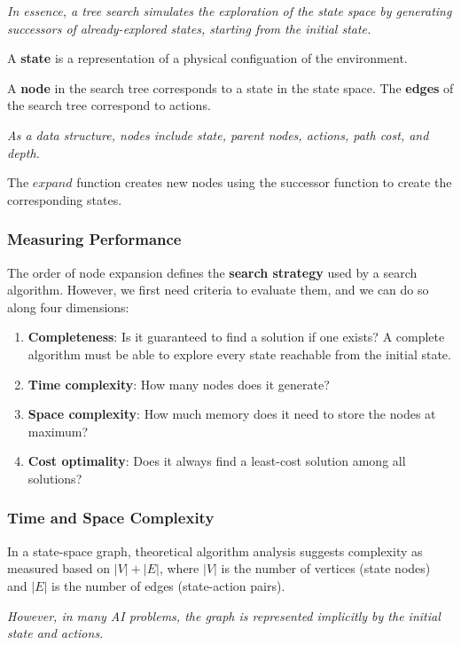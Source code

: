 \emph{In essence, a tree search simulates the exploration of the state space by generating successors of already-explored states, starting from the initial state.}

A \textbf{state} is a representation of a physical configuation of the environment.

A \textbf{node} in the search tree corresponds to a state in the state space. The \textbf{edges} of the search tree correspond to actions.

\emph{As a data structure, nodes include state, parent nodes, actions, path cost, and depth.}

The $expand$ function creates new nodes using the successor function to create the corresponding states.


\subsubsection{Measuring Performance}

The order of node expansion defines the \textbf{search strategy} used by a search algorithm.
However, we first need criteria to evaluate them, and we can do so along four dimensions:

\begin{enumerate}[leftmargin=*]
    \item \textbf{Completeness}: Is it guaranteed to find a solution if one exists? A complete algorithm must be able to explore every state reachable from the initial state.
    \item \textbf{Time complexity}: How many nodes does it generate?
    \item \textbf{Space complexity}: How much memory does it need to store the nodes at maximum?
    \item \textbf{Cost optimality}: Does it always find a least-cost solution among all solutions?
\end{enumerate}


\subsubsection{Time and Space Complexity}

In a state-space graph, theoretical algorithm analysis suggests complexity as measured based on $|V| + |E|$, where $|V|$ is the number of vertices (state nodes) and $|E|$ is the number of edges (state-action pairs).

\emph{However, in many AI problems, the graph is represented implicitly by the initial state and actions.}

